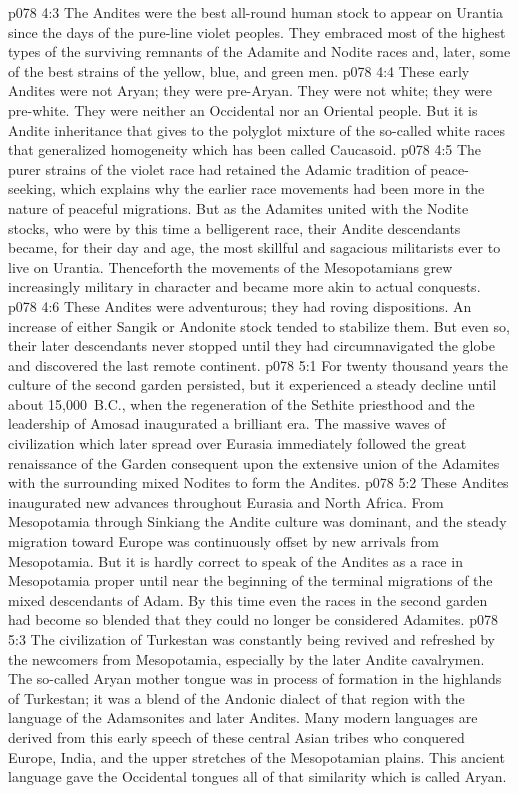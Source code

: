 \vs p078 4:3 The Andites were the best all\hyp{}round human stock to appear on Urantia since the days of the pure\hyp{}line violet peoples. They embraced most of the highest types of the surviving remnants of the Adamite and Nodite races and, later, some of the best strains of the yellow, blue, and green men.\plusone
\pc \vs p078 4:4 These early Andites were not Aryan; they were pre\hyp{}Aryan. They were not white; they were pre\hyp{}white. They were neither an Occidental nor an Oriental people. But it is Andite inheritance that gives to the polyglot mixture of the so\hyp{}called white races that generalized homogeneity which has been called Caucasoid.
\pc \vs p078 4:5 The purer strains of the violet race had retained the Adamic tradition of peace\hyp{}seeking, which explains why the earlier race movements had been more in the nature of peaceful migrations. But as the Adamites united with the Nodite stocks, who were by this time a belligerent race, their Andite descendants became, for their day and age, the most skillful and sagacious militarists ever to live on Urantia. Thenceforth the movements of the Mesopotamians grew increasingly military in character and became more akin to actual conquests.
\vs p078 4:6 These Andites were adventurous; they had roving dispositions. An increase of either Sangik or Andonite stock tended to stabilize them. But even so, their later descendants never stopped until they had circumnavigated the globe and discovered the last remote continent.
\vs p078 5:1 For twenty thousand years the culture of the second garden persisted, but it experienced a steady decline until about 15,000~B.C., when the regeneration of the Sethite priesthood and the leadership of Amosad inaugurated a brilliant era. The massive waves of civilization which later spread over Eurasia immediately followed the great renaissance of the Garden consequent upon the extensive union of the Adamites with the surrounding mixed Nodites to form the Andites.
\vs p078 5:2 These Andites inaugurated new advances throughout Eurasia and North Africa. From Mesopotamia through Sinkiang the Andite culture was dominant, and the steady migration toward Europe was continuously offset by new arrivals from Mesopotamia. But it is hardly correct to speak of the Andites as a race in Mesopotamia proper until near the beginning of the terminal migrations of the mixed descendants of Adam. By this time even the races in the second garden had become so blended that they could no longer be considered Adamites.
\vs p078 5:3 The civilization of Turkestan was constantly being revived and refreshed by the newcomers from Mesopotamia, especially by the later Andite cavalrymen. The so\hyp{}called Aryan mother tongue was in process of formation in the highlands of Turkestan; it was a blend of the Andonic dialect of that region with the language of the Adamsonites and later Andites. Many modern languages are derived from this early speech of these central Asian tribes who conquered Europe, India, and the upper stretches of the Mesopotamian plains. This ancient language gave the Occidental tongues all of that similarity which is called Aryan.

